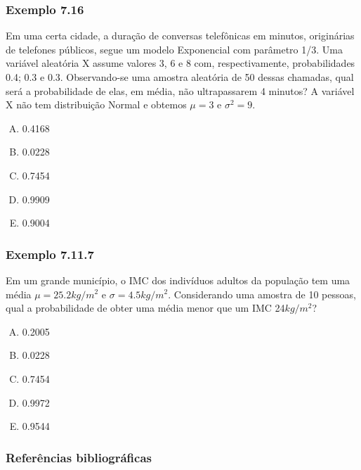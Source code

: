 \documentclass[11pt]{beamer}
\begin{document}
\begin{frame}
\frametitle{Exemplo 7.16}
Em uma certa cidade, a duração de conversas telefônicas em minutos, originárias de telefones públicos, segue um modelo Exponencial com parâmetro 1/3. 
Uma variável aleatória X assume valores 3, 6 e 8 com, respectivamente, probabilidades 0.4; 0.3 e 0.3. Observando-se uma amostra aleatória de 50 dessas chamadas, qual será a probabilidade de elas, em média, não ultrapassarem 4 minutos? A variável X não tem distribuição Normal e obtemos \(\mu=3\) e \(\sigma^2=9\).
\begin{enumerate}[A)]
\item 0.4168
\item 0.0228
\item 0.7454
\item 0.9909
\item 0.9004
\end{enumerate}

\end{frame}

\begin{frame}
\frametitle{Exemplo 7.11.7}
Em um grande município, o IMC dos indivíduos adultos da população tem uma média \(\mu=25.2kg/m^2\) e \(\sigma=4.5kg/m^2\). Considerando uma amostra de 10 pessoas, qual a probabilidade de obter uma média menor que um IMC 24\(kg/m^2\)?
\begin{enumerate}[A)]
\item 0.2005
\item 0.0228
\item 0.7454
\item 0.9972
\item 0.9544
\end{enumerate}

\end{frame}


\begin{frame}
\frametitle{Referências bibliográficas}
\printbibliography
\end{frame}
\end{document}
